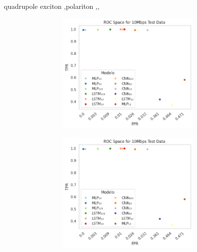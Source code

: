 \documentclass[a4paper,fleqn]{cas-sc}
\begin{document}
	\begin{keywords}
		quadrupole exciton \sep polariton \sep \WGM \sep \BEC
	\end{keywords}
	
	
	\maketitle
	
	\centering

\begin{figure}
	\centering
	\begin{subcaptiongroup}
	\begin{subfigure}[t]{.4\textwidth}
		\centering
		\begin{subcaptiongroup}
			\begin{subfigure}[t]{0.3\textwidth}
				\includegraphics[width=\textwidth]{./figs/ROC-Space-Test-Data-10Mbps.png}
			\end{subfigure}
				\begin{subfigure}[t]{0.3\textwidth}
				\includegraphics[width=\textwidth]{./figs/ROC-Space-Test-Data-10Mbps.png}

\end{subfigure}
\end{subcaptiongroup}
\end{subfigure}
\end{subcaptiongroup}
\end{figure}
\end{document}
